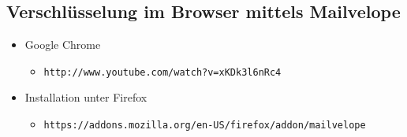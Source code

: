 \documentclass[a5paper]{scrartcl}
\begin{document}
\subsection*{Verschlüsselung im Browser mittels Mailvelope}
\begin{itemize}
   \item Google Chrome
      \begin{itemize}
         \item[] \texttt{http://www.youtube.com/watch?v=xKDk3l6nRc4}
      \end{itemize}
   \item Installation unter Firefox
      \begin{itemize}
         \item[] \footnotesize{\texttt{https://addons.mozilla.org/en-US/firefox/addon/mailvelope}} 
      \end{itemize}
\end{itemize}
\end{document}
